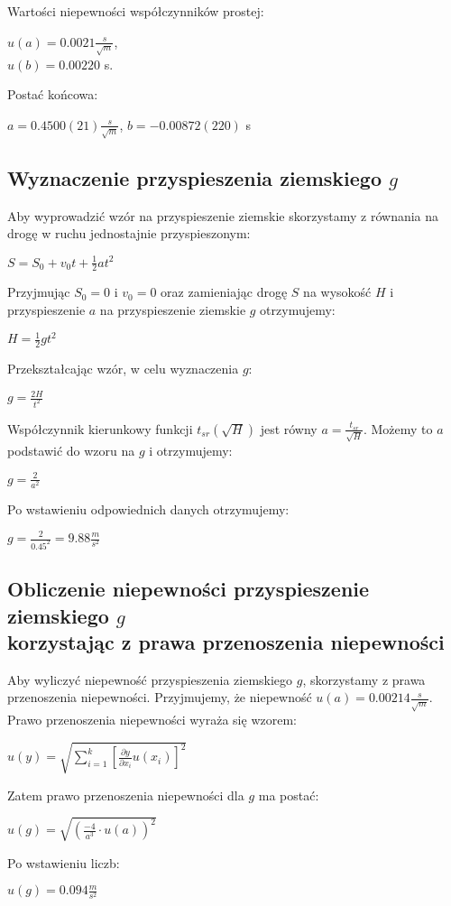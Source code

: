 \documentclass[12pt]{article}
\begin{document}
\begin{flushleft}
    Wartości niepewności współczynników prostej:
\end{flushleft}

\begin{center}
    $u(a) = 0.0021 \frac{s}{\sqrt{m}}$, \\
    $u(b) = 0.00220$ s.
\end{center}
Postać końcowa:
\begin{center}
    $a = 0.4500(21)\frac{s}{\sqrt{m}}$, $b = -0.00872(220)$ s
\end{center}
\subsection*{Wyznaczenie przyspieszenia ziemskiego $g$}

Aby wyprowadzić wzór na przyspieszenie ziemskie skorzystamy z równania na drogę
w ruchu jednostajnie przyspieszonym:
\begin{center}
    $ S = S_{0} + v_{0}t + \frac{1}{2}at^2$
\end{center}
Przyjmując $S_{0} = 0$ i $v_{0} = 0$ oraz zamieniając drogę $S$ na wysokość $H$
i przyspieszenie $a$ na przyspieszenie ziemskie $g$ otrzymujemy:
\begin{center}
    $H = \frac{1}{2}gt^2$
\end{center}
Przekształcając wzór, w celu wyznaczenia $g$:
\begin{center}
    $g = \frac{2H}{t^2}$
\end{center}
Współczynnik kierunkowy funkcji $t_{sr}(\sqrt{H})$ jest równy $a =
    \frac{t_{sr}}{\sqrt{H}}$. Możemy to $a$ podstawić do wzoru na $g$ i
otrzymujemy:
\begin{center}
    $g = \frac{2}{a^2}$
\end{center}
Po wstawieniu odpowiednich danych otrzymujemy:
\begin{center}
    $g = \frac{2}{0.45^2} = 9.88 \frac{m}{s^2}$
\end{center}

\subsection*{Obliczenie niepewności przyspieszenie ziemskiego $g$ \\
    korzystając z prawa przenoszenia niepewności}

Aby wyliczyć niepewność przyspieszenia ziemskiego $g$, skorzystamy z prawa
przenoszenia niepewności. Przyjmujemy, że niepewność $u(a) = 0.00214
    \frac{s}{\sqrt{m}}$. Prawo przenoszenia niepewności wyraża się wzorem:
\begin{center}
    $u(y) = \sqrt{\sum_{i=1}^{k}[\frac{\partial y}{\partial x_i}u(x_i)]^2}$
\end{center}
Zatem prawo przenoszenia niepewności dla $g$ ma postać:
\begin{center}
    $u(g) = \sqrt{(\frac{-4}{a^3} \cdot u(a))^2}$
\end{center}
Po wstawieniu liczb:
\begin{center}
    $u(g) = 0.094 \frac{m}{s^2}$
\end{center}
\end{document}

